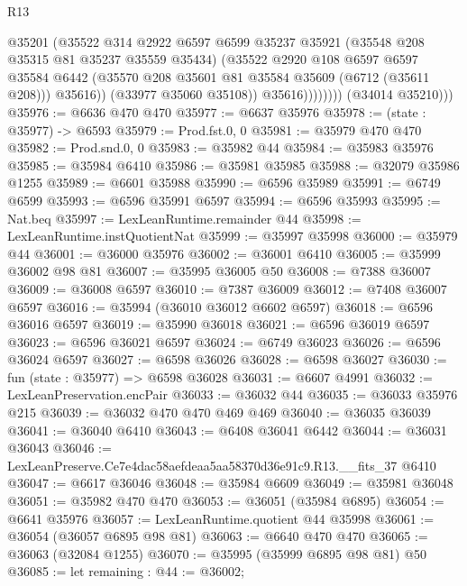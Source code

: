 \begin{lexlean}{R13}
\begin{coremodule}
                          @35201
                          (@35522
                            @314
                            @2922
                            @6597
                            @6599
                            @35237
                            @35921
                            (@35548 @208 @35315 @81 @35237 @35559 @35434)
                            (@35522
                              @2920
                              @108
                              @6597
                              @6597
                              @35584
                              @6442
                              (@35570 @208 @35601 @81 @35584 @35609 (@6712 (@35611 @208)))
                              @35616))
                          (@33977 @35060 @35108))
                        @35616))))))))
        (@34014 @35210)))
@35976 := @6636 @470 @470
@35977 := @6637 @35976
@35978 := (state : @35977) -> @6593
@35979 := Prod.fst.{0, 0}
@35981 := @35979 @470 @470
@35982 := Prod.snd.{0, 0}
@35983 := @35982 @44
@35984 := @35983 @35976
@35985 := @35984 @6410
@35986 := @35981 @35985
@35988 := @32079 @35986 @1255
@35989 := @6601 @35988
@35990 := @6596 @35989
@35991 := @6749 @6599
@35993 := @6596 @35991 @6597
@35994 := @6596 @35993
@35995 := Nat.beq
@35997 := LexLeanRuntime.remainder @44
@35998 := LexLeanRuntime.instQuotientNat
@35999 := @35997 @35998
@36000 := @35979 @44
@36001 := @36000 @35976
@36002 := @36001 @6410
@36005 := @35999 @36002 @98 @81
@36007 := @35995 @36005 @50
@36008 := @7388 @36007
@36009 := @36008 @6597
@36010 := @7387 @36009
@36012 := @7408 @36007 @6597
@36016 := @35994 (@36010 @36012 @6602 @6597)
@36018 := @6596 @36016 @6597
@36019 := @35990 @36018
@36021 := @6596 @36019 @6597
@36023 := @6596 @36021 @6597
@36024 := @6749 @36023
@36026 := @6596 @36024 @6597
@36027 := @6598 @36026
@36028 := @6598 @36027
@36030 := fun (state : @35977) => @6598 @36028
@36031 := @6607 @4991
@36032 := LexLeanPreservation.encPair
@36033 := @36032 @44
@36035 := @36033 @35976 @215
@36039 := @36032 @470 @470 @469 @469
@36040 := @36035 @36039
@36041 := @36040 @6410
@36043 := @6408 @36041 @6442
@36044 := @36031 @36043
@36046 := LexLeanPreserve.Ce7e4dac58aefdeaa5aa58370d36e91c9.R13.__fits_37 @6410
@36047 := @6617 @36046
@36048 := @35984 @6609
@36049 := @35981 @36048
@36051 := @35982 @470 @470
@36053 := @36051 (@35984 @6895)
@36054 := @6641 @35976
@36057 := LexLeanRuntime.quotient @44 @35998
@36061 := @36054 (@36057 @6895 @98 @81)
@36063 := @6640 @470 @470
@36065 := @36063 (@32084 @1255)
@36070 := @35995 (@35999 @6895 @98 @81) @50
@36085 := let remaining : @44 := @36002;

\end{coremodule}
\end{lexlean}
